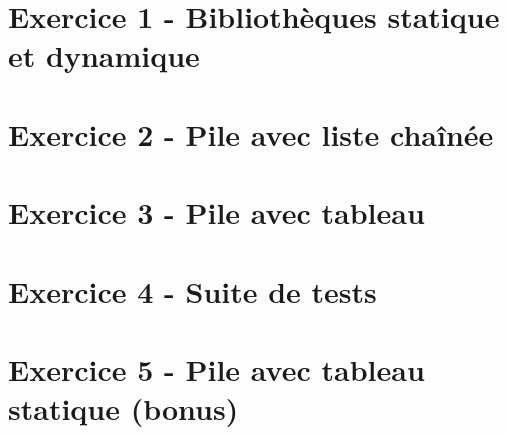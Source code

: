 \documentclass[12pt,a4paper]{article}
\begin{document}
\section{Exercice 1 - Bibliothèques statique et dynamique}

\vspace*{0.7cm}



\newpage

\section{Exercice 2 - Pile avec liste chaînée}

\vspace*{0.7cm}



\newpage

\section{Exercice 3 - Pile avec tableau}

\vspace*{0.7cm}



\newpage

\section{Exercice 4 - Suite de tests}

\vspace*{0.7cm}



\newpage
\section{Exercice 5 - Pile avec tableau statique (bonus)}

\vspace*{0.7cm}


\end{document}
